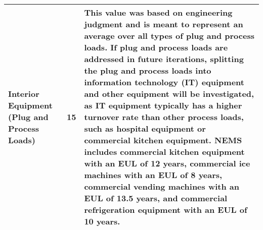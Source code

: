 \begin{table}
\begin{tabular}{|p{3cm}|p{1cm}|p{11cm}|}
\hline
Interior Equipment (Plug and Process Loads) & 15          & This value was based on engineering judgment and is meant to represent an average over all types of plug and process loads. If plug and process loads are addressed in future iterations, splitting the plug and process loads into information technology (IT) equipment and other equipment will be investigated, as IT equipment typically has a higher turnover rate than other process loads, such as hospital equipment or commercial kitchen equipment. NEMS includes commercial kitchen equipment with an EUL of 12 years, commercial ice machines with an EUL of 8 years, commercial vending machines with an EUL of 13.5 years, and commercial refrigeration equipment with an EUL of 10 years. \\
\hline
\end{tabular}
\end{table}